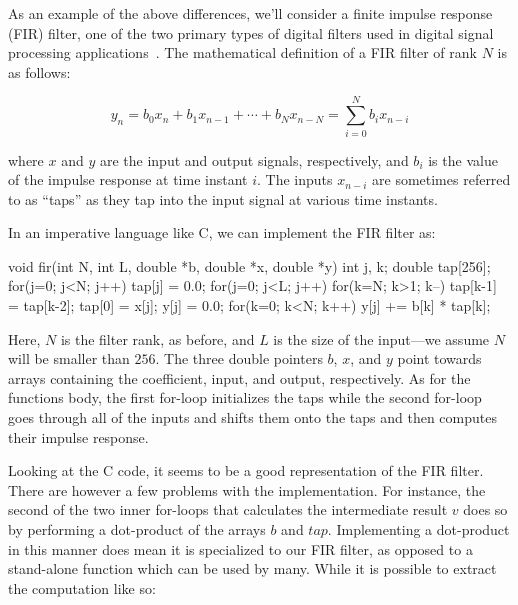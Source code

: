 \documentclass[../main.tex]{subfiles}
\begin{document}
As an example of the above differences, we'll consider a finite impulse response (FIR) filter, one of the two primary types of digital filters used in digital signal processing applications~\cite{oppenheim1989}. The mathematical definition of a FIR filter of rank $N$ is as follows:



\vspace{-2mm}
\begin{equation}
y_{n} = b_{0} x_{n} + b_{1} x_{n-1} + \cdots + b_{N} x_{n-N} = \sum_{i=0}^{N} b_{i} x_{n-i}
\end{equation}
\vspace{1mm}

\noindent where $x$ and $y$ are the input and output signals, respectively, and $b_i$ is the value of the impulse response at time instant $i$. The inputs $x_{n-i}$ are sometimes referred to as ``taps'' as they tap into the input signal at various time instants. 

In an imperative language like C, we can implement the FIR filter as:

\begin{code}
void fir(int N, int L, double *b, double *x, double *y)
{
 int j, k;
 double tap[256];
 for(j=0; j<N; j++) tap[j] = 0.0;
 for(j=0; j<L; j++)
 {
  for(k=N; k>1; k--) tap[k-1] = tap[k-2];
  tap[0] = x[j];
  y[j] = 0.0;
  for(k=0; k<N; k++) y[j] += b[k] * tap[k];
 }
}
\end{code}

\noindent Here, $N$ is the filter rank, as before, and $L$ is the size of the input---we assume $N$ will be smaller than $256$. The three double pointers $b$, $x$, and $y$ point towards arrays containing the coefficient, input, and output, respectively. As for the functions body, the first for-loop initializes the taps while the second for-loop goes through all of the inputs and shifts them onto the taps and then computes their impulse response.

Looking at the C code, it seems to be a good representation of the FIR filter. There are however a few problems with the implementation. For instance, the second of the two inner for-loops that calculates the intermediate result $v$ does so by performing a dot-product of the arrays $b$ and $tap$. Implementing a dot-product in this manner does mean it is specialized to our FIR filter, as opposed to a stand-alone function which can be used by many. While it is possible to extract the computation like so:
\end{document}
